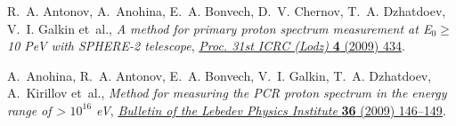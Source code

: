 \documentclass[a4paper,11pt]{article}
\begin{document}
\begin{thebibliography}{10}
R.~A. Antonov, A.~Anohina, E.~A. Bonvech, D.~V. Chernov, T.~A. Dzhatdoev, V.~I. Galkin et~al., \emph{A method for primary proton spectrum measurement at E$_0 \ge$ 10 PeV with SPHERE-2 telescope}, \href{https://galprop.stanford.edu/elibrary/icrc/2009/preliminary/pdf/icrc0434.pdf}{{\emph{{Proc. 31st ICRC (Lodz)}} {\bfseries 4} (2009) 434}}.

A.~Anohina, R.~A. Antonov, E.~A. Bonvech, V.~I. Galkin, T.~A. Dzhatdoev, A.~Kirillov et~al., \emph{Method for measuring the PCR proton spectrum in the energy range of > $10^{16}$ eV},
\href{http://dx.doi.org/10.3103/S1068335609050042}{\emph{Bulletin of the Lebedev Physics Institute} {\bfseries 36} (2009) 146--149}.

%



\end{thebibliography}


\end{document}
